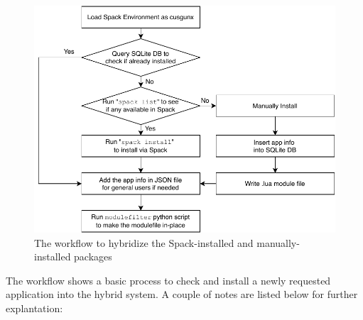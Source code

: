 \documentclass[conference]{IEEEtran}
\begin{document}
\begin{figure}[htbp]
  \centerline{\includegraphics[width=\linewidth]{figures/spack_h2_hybrid_flow}}
  \caption{The workflow to hybridize the Spack-installed and manually-installed packages}
  \label{fig:spack_h2_hybrid_flow}
\end{figure}

The workflow shows a basic process to check and install a newly requested application into the hybrid system. A couple of notes are listed below for further explantation:
\end{document}
